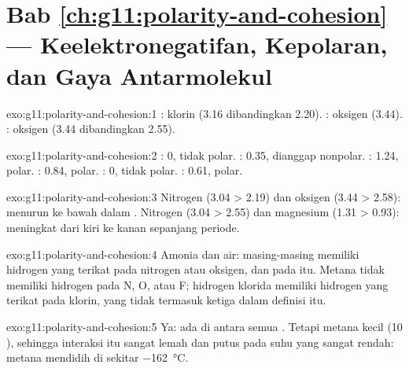 \section*{Bab \ref{ch:g11:polarity-and-cohesion} --- Keelektronegatifan, Kepolaran, dan Gaya Antarmolekul}

\begin{solution}{exo:g11:polarity-and-cohesion:1}
: klorin (3.16 dibandingkan 2.20). : oksigen (3.44).
: oksigen (3.44 dibandingkan 2.55).
\end{solution}

\begin{solution}{exo:g11:polarity-and-cohesion:2}
: 0, tidak polar. : 0.35, dianggap nonpolar. :
1.24, polar. : 0.84, polar. : 0, tidak polar.
: 0.61, polar.
\end{solution}

\begin{solution}{exo:g11:polarity-and-cohesion:3}
Nitrogen (3.04 > 2.19) dan oksigen (3.44 > 2.58): 
menurun ke bawah dalam . Nitrogen (3.04 > 2.55) dan magnesium
(1.31 > 0.93):  meningkat dari kiri ke kanan
sepanjang periode.
\end{solution}

\begin{solution}{exo:g11:polarity-and-cohesion:4}
Amonia dan air: masing-masing memiliki  hidrogen yang terikat pada
nitrogen atau oksigen, dan  pada  itu. Metana
tidak memiliki hidrogen pada N, O, atau F; hidrogen klorida memiliki
hidrogen yang terikat pada klorin, yang tidak termasuk ketiga  dalam
definisi itu.
\end{solution}

\begin{solution}{exo:g11:polarity-and-cohesion:5}
Ya:  ada di antara semua . Tetapi 
metana kecil (10 ), sehingga interaksi itu sangat lemah dan
putus pada suhu yang sangat rendah: metana mendidih di sekitar
\qty{-162}{\celsius}.
\end{solution}

